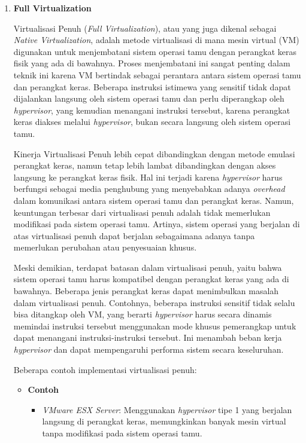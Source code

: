 \documentclass[12pt]{article}
\begin{document}
\begin{enumerate}
    \item \textbf{Full Virtualization}
    \par Virtualisasi Penuh (\textit{Full Virtualization}), atau yang juga dikenal sebagai \textit{Native Virtualization}, adalah metode virtualisasi di mana mesin virtual (VM) digunakan untuk menjembatani sistem operasi tamu dengan perangkat keras fisik yang ada di bawahnya. Proses menjembatani ini sangat penting dalam teknik ini karena VM bertindak sebagai perantara antara sistem operasi tamu dan perangkat keras. Beberapa instruksi istimewa yang sensitif tidak dapat dijalankan langsung oleh sistem operasi tamu dan perlu diperangkap oleh \textit{hypervisor}, yang kemudian menangani instruksi tersebut, karena perangkat keras diakses melalui \textit{hypervisor}, bukan secara langsung oleh sistem operasi tamu.
    
    \par Kinerja Virtualisasi Penuh lebih cepat dibandingkan dengan metode emulasi perangkat keras, namun tetap lebih lambat dibandingkan dengan akses langsung ke perangkat keras fisik. Hal ini terjadi karena \textit{hypervisor} harus berfungsi sebagai media penghubung yang menyebabkan adanya \textit{overhead} dalam komunikasi antara sistem operasi tamu dan perangkat keras. Namun, keuntungan terbesar dari virtualisasi penuh adalah tidak memerlukan modifikasi pada sistem operasi tamu. Artinya, sistem operasi yang berjalan di atas virtualisasi penuh dapat berjalan sebagaimana adanya tanpa memerlukan perubahan atau penyesuaian khusus.
    
    \par Meski demikian, terdapat batasan dalam virtualisasi penuh, yaitu bahwa sistem operasi tamu harus kompatibel dengan perangkat keras yang ada di bawahnya. Beberapa jenis perangkat keras dapat menimbulkan masalah dalam virtualisasi penuh. Contohnya, beberapa instruksi sensitif tidak selalu bisa ditangkap oleh VM, yang berarti \textit{hypervisor} harus secara dinamis memindai instruksi tersebut menggunakan mode khusus pemerangkap untuk dapat menangani instruksi-instruksi tersebut. Ini menambah beban kerja \textit{hypervisor} dan dapat mempengaruhi performa sistem secara keseluruhan.
    
    \par Beberapa contoh implementasi virtualisasi penuh:
    \begin{itemize}
        \item \textbf{Contoh}
        \begin{itemize}
            \item \textit{VMware ESX Server}: Menggunakan \textit{hypervisor} tipe 1 yang berjalan langsung di perangkat keras, memungkinkan banyak mesin virtual tanpa modifikasi pada sistem operasi tamu.
    

\end{itemize}
\end{itemize}
\end{enumerate}
\end{document}
